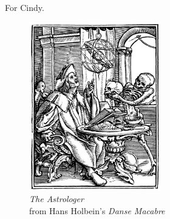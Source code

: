 
For Cindy.

\begin{figure}
    \vspace{50pt}
    \centering
    \includegraphics[width=0.51\textwidth]{assets/holbein-astrologer.jpg}
    \\
    \emph{The Astrologer}
    \\
    from Hans Holbein's \emph{Danse Macabre}
\end{figure}